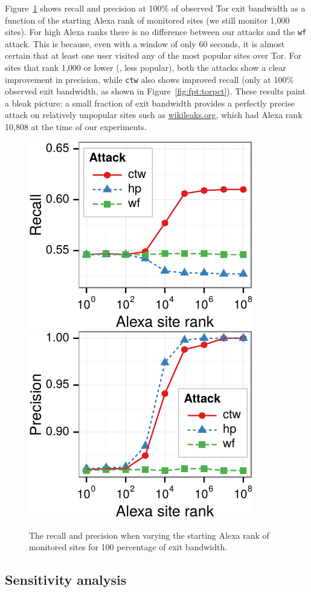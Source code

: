Figure~\ref{fig:fpt:alexa} shows recall and precision at 100\% of
observed Tor exit bandwidth as a function of the starting Alexa rank of
monitored sites (we still monitor 1,000 sites).
For high Alexa ranks there is no difference between our attacks and the
\texttt{wf} attack. This is because, even with a window of only 60 seconds,
it is almost certain that at least one user visited any of the most popular
sites over Tor. For sites that rank 1,000 or lower (\ie, less popular),
both the \name attacks show a clear improvement in precision, while
\texttt{ctw} also shows improved recall (only at 100\% observed exit bandwidth,
as shown in Figure~\ref{fig:fpt:torpct}).
These results paint a bleak picture: a small fraction of exit
bandwidth provides a perfectly precise attack on relatively
{unpopular} sites such as \url{wikileaks.org}, which had Alexa rank
10,808 at the time of our experiments.

\begin{figure}[t]
\centering
	\includegraphics[width=0.465\linewidth]{figures/fpt/alexa/1kx100+100k-recall-ggplot2}
	\includegraphics[width=0.465\linewidth]{figures/fpt/alexa/1kx100+100k-precision-ggplot2}
\caption{The recall and precision when varying the starting Alexa rank of
monitored sites for 100 percentage of exit bandwidth.}
\label{fig:fpt:alexa}
\end{figure}

\subsection{Sensitivity analysis}


